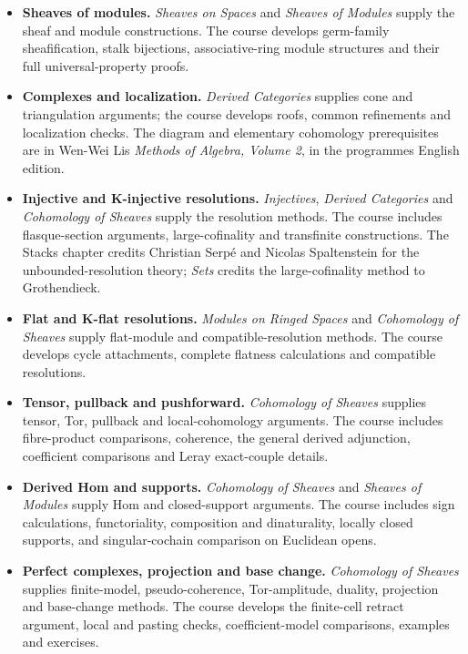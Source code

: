 \documentclass[
  english,
  11pt,
  a4paper,
]{article}
\providecommand{\tightlist}{%
  \setlength{\itemsep}{0pt}\setlength{\parskip}{0pt}}
\begin{document}
\begin{itemize}
\tightlist
\item
  \textbf{Sheaves of modules.} \emph{Sheaves on Spaces} and
  \emph{Sheaves of Modules} supply the sheaf and module constructions.
  The course develops germ-family sheafification, stalk bijections,
  associative-ring module structures and their full universal-property
  proofs.
\item
  \textbf{Complexes and localization.} \emph{Derived Categories}
  supplies cone and triangulation arguments; the course develops roofs,
  common refinements and localization checks. The diagram and elementary
  cohomology prerequisites are in Wen-Wei Li\textquotesingle s
  \emph{Methods of Algebra, Volume 2}, in the
  programme\textquotesingle s English edition.
\item
  \textbf{Injective and K-injective resolutions.} \emph{Injectives},
  \emph{Derived Categories} and \emph{Cohomology of Sheaves} supply the
  resolution methods. The course includes flasque-section arguments,
  large-cofinality and transfinite constructions. The Stacks chapter
  credits Christian Serpé and Nicolas Spaltenstein for the
  unbounded-resolution theory; \emph{Sets} credits the large-cofinality
  method to Grothendieck.
\item
  \textbf{Flat and K-flat resolutions.} \emph{Modules on Ringed Spaces}
  and \emph{Cohomology of Sheaves} supply flat-module and
  compatible-resolution methods. The course develops cycle attachments,
  complete flatness calculations and compatible resolutions.
\item
  \textbf{Tensor, pullback and pushforward.} \emph{Cohomology of
  Sheaves} supplies tensor, Tor, pullback and local-cohomology
  arguments. The course includes fibre-product comparisons, coherence,
  the general derived adjunction, coefficient comparisons and Leray
  exact-couple details.
\item
  \textbf{Derived Hom and supports.} \emph{Cohomology of Sheaves} and
  \emph{Sheaves of Modules} supply Hom and closed-support arguments. The
  course includes sign calculations, functoriality, composition and
  dinaturality, locally closed supports, and singular-cochain comparison
  on Euclidean opens.
\item
  \textbf{Perfect complexes, projection and base change.}
  \emph{Cohomology of Sheaves} supplies finite-model, pseudo-coherence,
  Tor-amplitude, duality, projection and base-change methods. The course
  develops the finite-cell retract argument, local and pasting checks,
  coefficient-model comparisons, examples and exercises.
\end{itemize}
\end{document}

